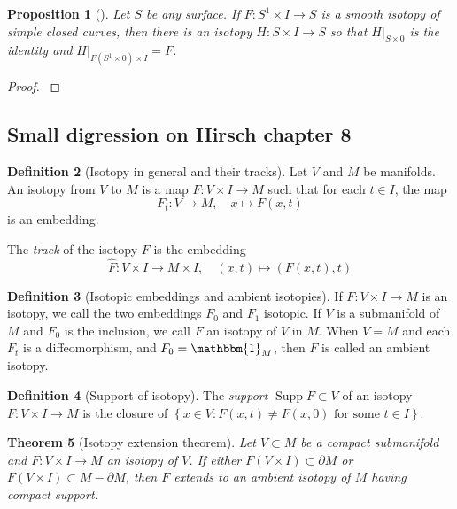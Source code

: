 \documentclass[reqno]{amsart}
\newtheorem{theorem}{Theorem}[section]
\newtheorem{proposition}[theorem]{Proposition}
\theoremstyle{definition}
\newtheorem{definition}[theorem]{Definition}
\theoremstyle{remark}
\DeclareMathOperator{\Supp}{Supp}
\begin{document}
\begin{proposition}[]
    Let $S$ be any surface. If $F \colon S^{1} \times I \to 
    S$ is a smooth isotopy of simple closed curves, then
    there is an isotopy $H \colon S \times I \to S$ so that
    $H |_{S \times 0}$ is the identity and 
    $H|_{F\left( S^{1} \times 0 \right) \times I} = F$.
\end{proposition}

\begin{proof}
    \cite[Ch~8, Thm 1.3]{Hirsch}
\end{proof}

\subsection{Small digression on Hirsch chapter 8}

\begin{definition}[Isotopy in general and their tracks]
    Let $V$ and $M$ be manifolds. An
    isotopy from $V$ to $M$ is a map
    $F \colon V \times I \to M$ such that
    for each $t \in I$, the map
    \[
    F_t \colon V \to M, \quad x \mapsto F(x,t)
    \] 
    is an embedding.

    The \textit{track} of the isotopy $F$ is the embedding
    \[
    \hat{F} \colon V \times I \to M \times I, \quad
    \left( x,t \right) \mapsto \left( F(x,t),t \right) 
    \] 
\end{definition}

\begin{definition}[Isotopic embeddings and ambient isotopies]
    If $F \colon V \times I \to M$ is an isotopy, we call
    the two embeddings $F_0$ and $F_1$ 
    isotopic. If $V$ is a submanifold of $M$ and
    $F_0$ is the inclusion, we call $F$ an isotopy
    of $V$ in $M$.
    When $V = M$ and each $F_t$ is a diffeomorphism, and
    $F_0 = \mathbbm{1}_M$, then $F$ is called
    an ambient isotopy.
\end{definition}

\begin{definition}[Support of isotopy]
    The \textit{support} $\Supp F
    \subset V $ of an isotopy $F \colon V \times I \to M$ 
    is the closure of
    $\left\{ x \in V \colon
    F(x,t) \neq F(x,0) \text{ for some }
t \in I\right\} $.
\end{definition}


\begin{theorem}[Isotopy extension theorem]\label{Hirsch-isotopy-extension}
    Let $V \subset M$ be a compact submanifold
    and $F \colon V \times I \to M$ an isotopy
    of $V$. If either $F\left( V \times I \right) 
    \subset \partial M$ or $F\left( V \times I \right) 
    \subset M - \partial M$, then $F$ extends to
    an ambient isotopy of $M$ having compact support.
\end{theorem}
\end{document}
